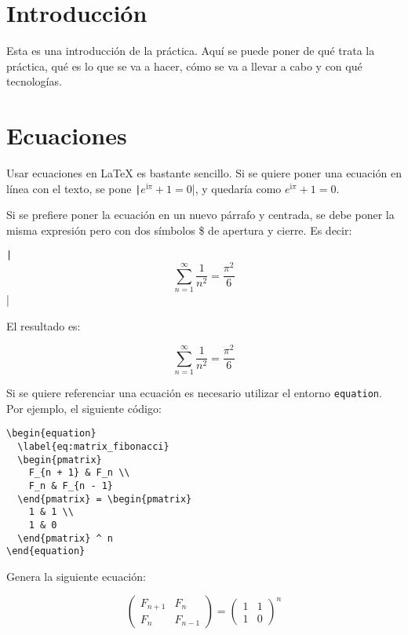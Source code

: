 \documentclass[../main.tex]{subfile}
\begin{document}
  \section{Introducción}

    Esta es una introducción de la práctica. Aquí se puede poner de qué trata la práctica, qué es lo que se va a hacer, cómo se va a llevar a cabo y con qué tecnologías.

  \section{Ecuaciones}

    Usar ecuaciones en LaTeX es bastante sencillo. Si se quiere poner una ecuación en línea con el texto, se pone \texttt|$e^{\mathrm{i}\pi} + 1 = 0$|, y quedaría como $e^{\mathrm{i}\pi} + 1 = 0$.

    Si se prefiere poner la ecuación en un nuevo párrafo y centrada, se debe poner la misma expresión pero con dos símbolos \$ de apertura y cierre. Es decir: 
    
    \texttt|$$\sum_{n = 1}^\infty \frac{1}{n^2} = \frac{\pi^2}{6}$$|
    
    El resultado es:

    $$
    \sum_{n = 1}^\infty \frac{1}{n^2} = \frac{\pi^2}{6}
    $$

    Si se quiere referenciar una ecuación es necesario utilizar el entorno \texttt{equation}. Por ejemplo, el siguiente código:

    \begin{verbatim}
\begin{equation}
  \label{eq:matrix_fibonacci}
  \begin{pmatrix}
    F_{n + 1} & F_n \\
    F_n & F_{n - 1}
  \end{pmatrix} = \begin{pmatrix}
    1 & 1 \\
    1 & 0
  \end{pmatrix} ^ n
\end{equation}
    \end{verbatim}

    Genera la siguiente ecuación:

    \begin{equation}
      \label{eq:matrix_fibonacci}
      \begin{pmatrix}
        F_{n + 1} & F_n \\
        F_n & F_{n - 1}
      \end{pmatrix} = \begin{pmatrix}
        1 & 1 \\
        1 & 0
      \end{pmatrix} ^ n
    \end{equation}
\end{document}

